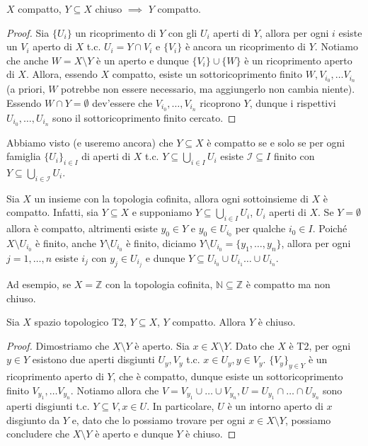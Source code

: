 \begin{thm} \label{ccc}
  $X$ compatto, $Y \subseteq X$ chiuso $\implies$ $Y$ compatto.
\end{thm}

\begin{proof}
  Sia $\{U_i\}$ un ricoprimento di $Y$ con gli $U_i$ aperti di $Y$, allora per ogni $i$ esiste un $V_i$ aperto di $X$ t.c. $U_i=Y \cap V_i$ e $\{V_i\}$ è ancora un ricoprimento di $Y$. Notiamo che anche $W=X \setminus Y$ è un aperto e dunque $\{V_i\} \cup \{W\}$ è un ricoprimento aperto di $X$.
  Allora, essendo $X$ compatto, esiste un sottoricoprimento finito $W, V_{i_0}, \dots V_{i_n}$ (a priori, $W$ potrebbe non essere necessario, ma aggiungerlo non cambia niente). Essendo $W \cap Y=\emptyset$ dev'essere che $V_{i_0}, \dots, V_{i_n}$ ricoprono $Y$, dunque i rispettivi $U_{i_0}, \dots, U_{i_n}$ sono il sottoricoprimento finito cercato.
\end{proof}

\begin{oss}
  Abbiamo visto (e useremo ancora) che $Y \subseteq X$ è compatto se e solo se per ogni famiglia $\{U_i\}_{i \in I}$ di aperti di $X$ t.c. $\displaystyle Y \subseteq \bigcup_{i \in I} U_i$ esiste $\mathcal{I} \subseteq I$ finito con $\displaystyle Y \subseteq \bigcup_{i \in \mathcal{I}} U_i$.
\end{oss}

\begin{ex}
  Sia $X$ un insieme con la topologia cofinita, allora ogni sottoinsieme di $X$ è compatto. Infatti, sia $Y \subseteq X$ e supponiamo $\displaystyle Y \subseteq \bigcup_{i \in I} U_i$, $U_i$ aperti di $X$. Se $Y=\emptyset$ allora è compatto, altrimenti esiste $y_0 \in Y$ e $y_0 \in U_{i_0}$ per qualche $i_0 \in I$.
  Poiché $X \setminus U_{i_0}$ è finito, anche $Y \setminus U_{i_0}$ è finito, diciamo $Y \setminus U_{i_0}=\{y_1, \dots, y_n\}$, allora per ogni $j=1, \dots, n$ esiste $i_j$ con $y_j \in U_{i_j}$ e dunque $Y \subseteq U_{i_0} \cup U_{i_1} \dots \cup U_{i_n}$.

  Ad esempio, se $X=\mathbb{Z}$ con la topologia cofinita, $\mathbb{N} \subseteq \mathbb{Z}$ è compatto ma non chiuso.
\end{ex}

\begin{thm} \label{chc}
  Sia $X$ spazio topologico T2, $Y \subseteq X$, $Y$ compatto. Allora $Y$ è chiuso.
\end{thm}

\begin{proof}
  Dimostriamo che $X \setminus Y$ è aperto. Sia $x \in X \setminus Y$. Dato che $X$ è T2, per ogni $y \in Y$ esistono due aperti disgiunti $U_y, V_y$ t.c. $x \in U_y, y \in V_y$.
  $\{V_y\}_{y \in Y}$ è un ricoprimento aperto di $Y$, che è compatto, dunque esiste un sottoricoprimento finito $V_{y_1}, \dots V_{y_n}$. Notiamo allora che $V=V_{y_1} \cup \dots \cup V_{y_n}, U=U_{y_1} \cap \dots \cap U_{y_n}$ sono aperti disgiunti t.c. $Y \subseteq V, x \in U$.
  In particolare, $U$ è un intorno aperto di $x$ disgiunto da $Y$ e, dato che lo possiamo trovare per ogni $x \in X \setminus Y$, possiamo concludere che $X \setminus Y$ è aperto e dunque $Y$ è chiuso.
\end{proof}

